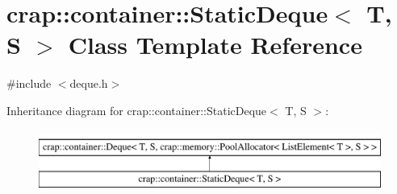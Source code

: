 \hypertarget{classcrap_1_1container_1_1_static_deque}{\section{crap\-:\-:container\-:\-:Static\-Deque$<$ T, S $>$ Class Template Reference}
\label{classcrap_1_1container_1_1_static_deque}
}


{\ttfamily \#include $<$deque.\-h$>$}

Inheritance diagram for crap\-:\-:container\-:\-:Static\-Deque$<$ T, S $>$\-:\begin{figure}[H]
\begin{center}
\leavevmode
\includegraphics[height=2.000000cm]{classcrap_1_1container_1_1_static_deque}
\end{center}
\end{figure}
